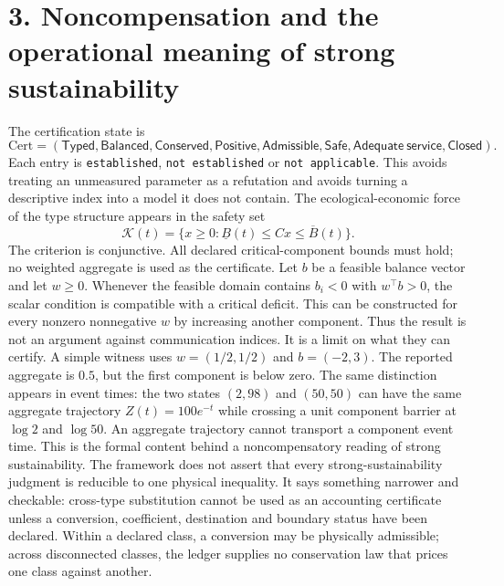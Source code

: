 \documentclass[11pt]{article}
\begin{document}
\section{3. Noncompensation and the operational meaning of strong sustainability}
The certification state is
\[\mathrm{Cert}=(\mathsf{Typed},\mathsf{Balanced},\mathsf{Conserved},\mathsf{Positive},\mathsf{Admissible},\mathsf{Safe},\mathsf{Adequate\ service},\mathsf{Closed}).\]
Each entry is \texttt{established}, \texttt{not established} or \texttt{not applicable}. This avoids treating an unmeasured parameter as a refutation and avoids turning a descriptive index into a model it does not contain.
The ecological-economic force of the type structure appears in the safety set
\[\mathcal{K}(t)=\{x\ge0:\underline B(t)\le Cx\le\overline B(t)\}.\]
The criterion is conjunctive. All declared critical-component bounds must hold; no weighted aggregate is used as the certificate. Let \(b\) be a feasible balance vector and let \(w\ge0\). Whenever the feasible domain contains \(b_i<0\) with \(w^\top b>0\), the scalar condition is compatible with a critical deficit. This can be constructed for every nonzero nonnegative \(w\) by increasing another component. Thus the result is not an argument against communication indices. It is a limit on what they can certify.
A simple witness uses \(w=(1/2,1/2)\) and \(b=(-2,3)\). The reported aggregate is \(0.5\), but the first component is below zero. The same distinction appears in event times: the two states \((2,98)\) and \((50,50)\) can have the same aggregate trajectory \(Z(t)=100e^{-t}\) while crossing a unit component barrier at \(\log2\) and \(\log50\). An aggregate trajectory cannot transport a component event time.
This is the formal content behind a noncompensatory reading of strong sustainability. The framework does not assert that every strong-sustainability judgment is reducible to one physical inequality. It says something narrower and checkable: cross-type substitution cannot be used as an accounting certificate unless a conversion, coefficient, destination and boundary status have been declared. Within a declared class, a conversion may be physically admissible; across disconnected classes, the ledger supplies no conservation law that prices one class against another.
\end{document}
